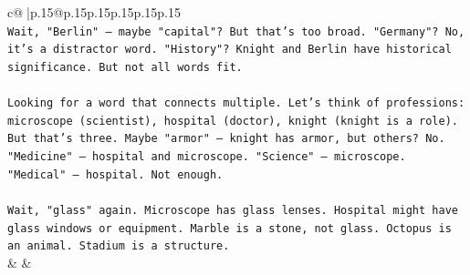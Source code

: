 \documentclass{article}
\begin{document}
{\begin{supertabular}{c@{$\;$}|p{.15\linewidth}@{}p{.15\linewidth}p{.15\linewidth}p{.15\linewidth}p{.15\linewidth}p{.15\linewidth}}
{{{\\ 
\texttt{Wait, "Berlin" – maybe "capital"? But that's too broad. "Germany"? No, it's a distractor word. "History"? Knight and Berlin have historical significance. But not all words fit.} \\
\\ 
\texttt{Looking for a word that connects multiple. Let's think of professions: microscope (scientist), hospital (doctor), knight (knight is a role). But that's three. Maybe "armor" – knight has armor, but others? No. "Medicine" – hospital and microscope. "Science" – microscope. "Medical" – hospital. Not enough.} \\
\\ 
\texttt{Wait, "glass" again. Microscope has glass lenses. Hospital might have glass windows or equipment. Marble is a stone, not glass. Octopus is an animal. Stadium is a structure.} \\
            }
        }
    }
    & & \\ \\


\end{supertabular}}
\end{document}
